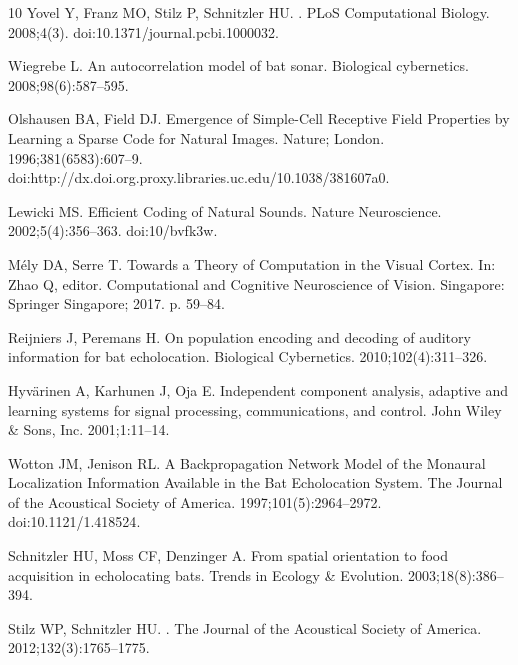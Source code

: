 \documentclass[10pt,letterpaper]{article}
\begin{document}
\begin{thebibliography}{10}
	Yovel Y, Franz MO, Stilz P, Schnitzler HU.
	.
	\newblock PLoS Computational Biology. 2008;4(3).
	\newblock doi:{10.1371/journal.pcbi.1000032}.
	
	Wiegrebe L.
	\newblock An autocorrelation model of bat sonar.
	\newblock Biological cybernetics. 2008;98(6):587--595.
	
	Olshausen BA, Field DJ.
	\newblock Emergence of Simple-Cell Receptive Field Properties by Learning a
	Sparse Code for Natural Images.
	\newblock Nature; London. 1996;381(6583):607--9.
	\newblock doi:{http://dx.doi.org.proxy.libraries.uc.edu/10.1038/381607a0}.
	
	Lewicki MS.
	\newblock Efficient Coding of Natural Sounds.
	\newblock Nature Neuroscience. 2002;5(4):356--363.
	\newblock doi:{10/bvfk3w}.
	
	M{\'e}ly DA, Serre T.
	\newblock Towards a {{Theory}} of {{Computation}} in the {{Visual Cortex}}.
	\newblock In: Zhao Q, editor. Computational and {{Cognitive Neuroscience}} of
	{{Vision}}. {Singapore}: {Springer Singapore}; 2017. p. 59--84.
	
	Reijniers J, Peremans H.
	\newblock On population encoding and decoding of auditory information for bat
	echolocation.
	\newblock Biological Cybernetics. 2010;102(4):311--326.
	
	Hyv{\"a}rinen A, Karhunen J, Oja E.
	\newblock Independent component analysis, adaptive and learning systems for
	signal processing, communications, and control.
	\newblock John Wiley \& Sons, Inc. 2001;1:11--14.
	
	Wotton JM, Jenison RL.
	\newblock A Backpropagation Network Model of the Monaural Localization
	Information Available in the Bat Echolocation System.
	\newblock The Journal of the Acoustical Society of America.
	1997;101(5):2964--2972.
	\newblock doi:{10.1121/1.418524}.
	
	Schnitzler HU, Moss CF, Denzinger A.
	\newblock From spatial orientation to food acquisition in echolocating bats.
	\newblock Trends in Ecology \& Evolution. 2003;18(8):386--394.
	
	Stilz WP, Schnitzler HU.
	.
	\newblock The Journal of the Acoustical Society of America.
	2012;132(3):1765--1775.
	

\end{thebibliography}
\end{document}

